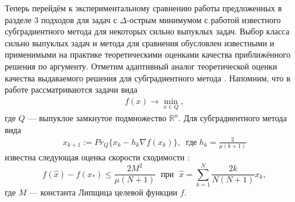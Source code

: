     Теперь перейдём к экспериментальному сравнению работы предложенных в разделе 3 подходов для задач с $\Delta$-острым минимумом с работой известного субградиентного метода \cite{Bach_2012} для некоторых сильно выпуклых задач. Выбор класса сильно выпуклых задач и метода \cite{Bach_2012} для сравнения обусловлен известными и  применимыми на практике теоретическими оценками качества приближённого решения по аргументу. Отметим адаптивный аналог \cite{Stonyakin_2021} теоретической оценки качества выдаваемого решения для субградиентного метода \cite{Bach_2012}. Напомним, что в работе рассматриваются задачи вида
    \begin{gather}\label{min_q}
        f(x)\rightarrow\min_{x\in Q},
    \end{gather}
    где $Q$ --- выпуклое замкнутое подмножество $\mathbb{R}^{n}$. Для субградиентного метода вида
    \begin{gather}\label{orig}
        x_{k+1} := Pr_{Q}\{x_k - h_k \nabla f(x_k) \}, \;\; \textit{где} \; h_k = \frac{2}{\mu (k+1)}
    \end{gather}
    известна следующая оценка скорости сходимости \cite{Bach_2012}:
    \begin{equation}\label{orig_estimation_f}
        f(\widehat{x}) - f(x_*) \leq \frac{2 M^2}{\mu (N+1)}  \; \text{  при   } \; \widehat{x} = \sum\limits_{k=1}^{N} \frac{2 k}{N (N+1)} x_k, 
    \end{equation}
    где $M$ --- константа Липщица целевой функции $f$.

